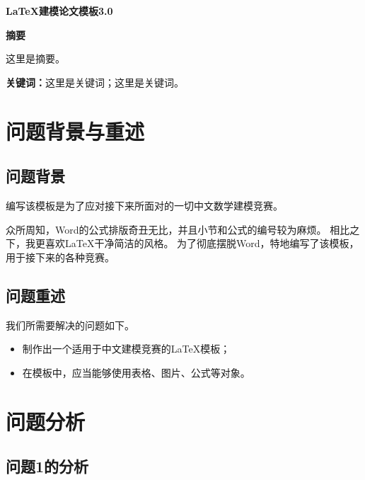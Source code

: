 \documentclass[12pt, a4paper, oneside]{ctexart}
\begin{document}
    \pagestyle{empty}
    \setcounter{page}{0}

    \begin{center}
        \Large{\textbf{\LaTeX 建模论文模板3.0}}
    \end{center}

    \begin{center}
        \Large{\textbf{摘要}}
    \end{center}

    这里是摘要。

    \textbf{关键词：}这里是关键词；这里是关键词。

    \newpage
    \tableofcontents
    \newpage
    \setcounter{page}{1}
    \pagestyle{plain}
    \fancyfoot[C]{\thepage}

    \section{问题背景与重述}

    \subsection{问题背景}

    编写该模板是为了应对接下来所面对的一切中文数学建模竞赛。

    众所周知，Word的公式排版奇丑无比，并且小节和公式的编号较为麻烦。
    相比之下，我更喜欢\LaTeX 干净简洁的风格。
    为了彻底摆脱Word，特地编写了该模板，用于接下来的各种竞赛。

    \subsection{问题重述}

    我们所需要解决的问题如下。
    \begin{itemize}
        \item 制作出一个适用于中文建模竞赛的\LaTeX 模板；
        \item 在模板中，应当能够使用表格、图片、公式等对象。
    \end{itemize}

    \section{问题分析}

    \subsection{问题1的分析}
\end{document}
